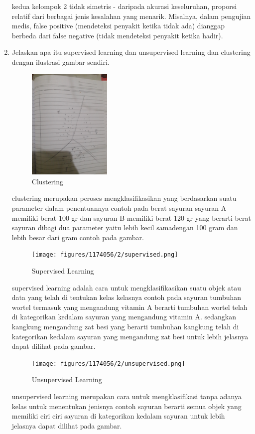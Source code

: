 \begin{enumerate}
	kedua kelompok 2 tidak simetris - daripada akurasi keseluruhan, proporsi relatif dari berbagai jenis kesalahan yang menarik. 
	Misalnya, dalam pengujian medis, false positive (mendeteksi penyakit ketika tidak ada) dianggap berbeda dari false negative 
	(tidak mendeteksi penyakit ketika hadir).
	\item Jelaskan apa itu supervised learning dan unsupervised learning dan clustering dengan ilustrasi gambar sendiri.
	\hfill\break
	\begin{figure}[H]
		\includegraphics[width=4cm]{figures/1174056/2/clustering.jpg}
		\centering
		\caption{Clustering}
	\end{figure}
	\hfill\break
	clustering merupakan peroses mengklasifikasikan yang berdasarkan suatu parameter dalam penentuannya contoh pada berat sayuran sayuran A memiliki berat 100 gr dan sayuran B memiliki berat 120 gr yang berarti berat sayuran dibagi dua parameter yaitu lebih kecil samadengan 100 gram dan lebih besar dari gram contoh pada gambar.\par
		\begin{figure}[H]
		\texttt{[image: figures/1174056/2/supervised.png]}
		\centering
		\caption{Supervised Learning}
	\end{figure}
	\hfill\break
	supervised learning adalah cara untuk mengklasifikasikan suatu objek atau data yang telah di tentukan kelas kelasnya contoh pada sayuran tumbuhan wortel termasuk yang mengandung vitamin A berarti tumbuhan wortel telah di kategorikan kedalam sayuran yang mengandung vitamin A. sedangkan kangkung mengandung zat besi yang berarti tumbuhan kangkung telah di kategorikan kedalam sayuran yang mengandung zat besi untuk lebih jelasnya dapat dilihat pada gambar.\par
		\begin{figure}[H]
		\texttt{[image: figures/1174056/2/unsupervised.png]}
		\centering
		\caption{Unsupervised Learning}
	\end{figure}
	\hfill\break
	unsupervised learning merupakan cara untuk mengklasifikasi tanpa adanya kelas untuk menentukan jenisnya contoh sayuran berarti semua objek yang memiliki ciri ciri sayuran di kategorikan kedalam sayuran untuk lebih jelasnya dapat dilihat pada gambar.\par

\end{enumerate}
